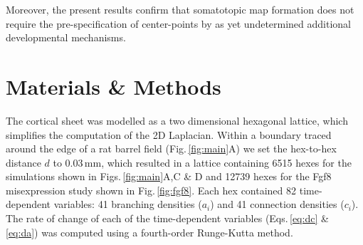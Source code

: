 \documentclass[9pt,lineno]{elife}
\begin{document}
Moreover, the present results confirm that somatotopic map formation does not
require the pre-specification of center-points by as yet undetermined
additional developmental mechanisms.

\section{Materials \& Methods}

%
%

The cortical sheet was modelled as a two dimensional hexagonal lattice, which
simplifies the computation of the 2D Laplacian. Within a boundary traced
around the edge of a
rat barrel field (Fig.\,\ref{fig:main}A) we set the hex-to-hex distance
$d$ to 0.03\,mm, which resulted in a lattice containing 6515 hexes for the
simulations shown in Figs.\,\ref{fig:main}A,C \& D and 12739 hexes for the Fgf8
misexpression study shown in Fig.\,\ref{fig:fgf8}. Each hex contained 82 time-dependent
variables: 41 branching densities ($a_i$) and 41 connection densities ($c_i$).
The rate of change of each of the time-dependent variables (Eqs.\,\ref{eq:dc}
\& \ref{eq:da}) was computed using a fourth-order Runge-Kutta method.
\end{document}
